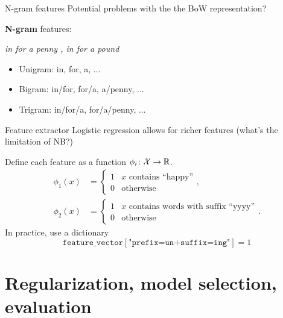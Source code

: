 \documentclass[usenames,dvipsnames,notes,11pt,aspectratio=169]{beamer}
\newcommand{\pdfnote}[1]{}
\begin{document}
\begin{frame}
    {N-gram features}
    Potential problems with the the BoW representation?

    \pause
    \textbf{N-gram} features:
    \begin{center}
        \textit{in for a penny , in for a pound}
    \end{center}
    \begin{itemize}
        \item Unigram: in, for, a, ...
        \item Bigram: in/for, for/a, a/penny, ...
        \item Trigram: in/for/a, for/a/penny, ...
    \end{itemize}

    \pdfnote{
        BoW problem: new york, don't like
    }
\end{frame}

\begin{frame}
    {Feature extractor}
    Logistic regression allows for richer features (what's the limitation of NB?)

    Define each feature as a function $\phi_i\colon \mathcal{X} \rightarrow \mathbb{R}$.
    \begin{align*}
 \phi_1(x) &= \begin{cases}
 1 & \text{$x$ contains ``happy''} \\
 0 & \text{otherwise}
 \end{cases} ,
 \\
 \phi_2(x) &= \begin{cases}
 1 & \text{$x$ contains words with suffix ``yyyy''} \\
 0 & \text{otherwise}
 \end{cases} .
    \end{align*}
    In practice, use a dictionary
    $$
    \texttt{feature\_vector}[\texttt{"prefix=un+suffix=ing"}] = 1
    $$
    \pdfnote{
        With NB, we can still include these features as variables, but we'll have to think about modeling them as a parametrized distribution and handling the sparsity problem during estimation.
    }
\end{frame}


\section{Regularization, model selection, evaluation}
\end{document}
